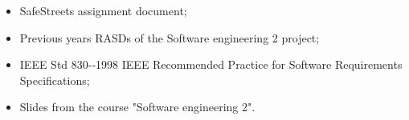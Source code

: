 \begin{itemize}
    \item SafeStreets assignment document;
    \item Previous years RASDs of the Software engineering 2 project;
    \item IEEE Std 830-­‐1998 IEEE Recommended Practice	for	Software Requirements Specifications;	
    \item Slides from the course "Software engineering 2".
\end{itemize}
